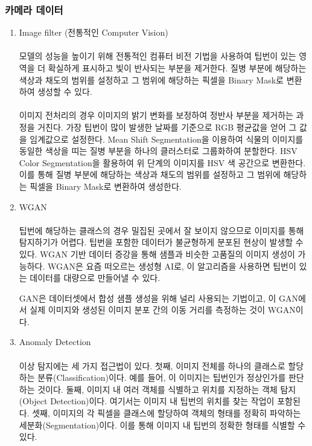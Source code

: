 \documentclass[11pt]{article}
\begin{document}
    \subsubsection{카메라 데이터}
    
    \begin{enumerate}
        \item {Image filter (전통적인 Computer Vision)} 
    \paragraph{} 모델의 성능을 높이기 위해 전통적인 컴퓨터 비전 기법을 사용하여 팁번이 있는 영역을 더 확실하게 표시하고 빛이 반사되는 부분을 제거한다. 질병 부분에 해당하는 색상과 채도의 범위를 설정하고 그 범위에 해당하는 픽셀을 Binary Mask로 변환하여 생성할 수 있다. 

    \paragraph{} 이미지 전처리의 경우 이미지의 밝기 변화를 보정하여 정반사 부분을 제거하는 과정을 거친다. 가장 팁번이 많이 발생한 날짜를 기준으로 RGB 평균값을 얻어 그 값을 임계값으로 설정한다\citep{__2022}. Mean Shift Segmentation을 이용하여 식물의 이미지를 동일한 색상을 띠는 질병 부분을 하나의 클러스터로 그룹화하여 분할한다. HSV Color Segmentation을 활용하여 위 단계의 이미지를 HSV 색 공간으로 변환한다. 이를 통해 질병 부분에 해당하는 색상과 채도의 범위를 설정하고 그 범위에 해당하는 픽셀을 Binary Mask로 변환하여 생성한다.

        \item {WGAN}
    \paragraph{} 팁번에 해당하는 클래스의 경우 밀집된 곳에서 잘 보이지 않으므로 이미지를 통해 탐지하기가 어렵다. 팁번을 포함한 데이터가 불균형하게 분포된 현상이 발생할 수 있다\citep{gozzovelli2021tip}. WGAN 기반 데이터 증강을 통해 샘플과 비슷한 고품질의 이미지 생성이 가능하다. WGAN은 요즘 떠오르는 생성형 AI로, 이 알고리즘을 사용하면 팁번이 있는 데이터를 대량으로 만들어낼 수 있다.

    
    GAN은 데이터셋에서 합성 샘플 생성을 위해 널리 사용되는 기법이고, 이 GAN에서 실제 이미지와 생성된 이미지 분포 간의 이동 거리를 측정하는 것이 WGAN이다.

        \item {Anomaly Detection}
    
    \paragraph{} 이상 탐지에는 세 가지 접근법이 있다. 첫째, 이미지 전체를 하나의 클래스로 할당하는 분류(Classification)이다. 예를 들어, 이 이미지는 팁번인가 정상인가를 판단하는 것이다. 둘째, 이미지 내 여러 객체를 식별하고 위치를 지정하는 객체 탐지(Object Detection)이다. 여기서는 이미지 내 팁번의 위치를 찾는 작업이 포함된다. 셋째, 이미지의 각 픽셀을 클래스에 할당하여 객체의 형태를 정확히 파악하는 세분화(Segmentation)이다. 이를 통해 이미지 내 팁번의 정확한 형태를 식별할 수 있다\citep{liu2021plant}. 



\end{enumerate}
\end{document}
